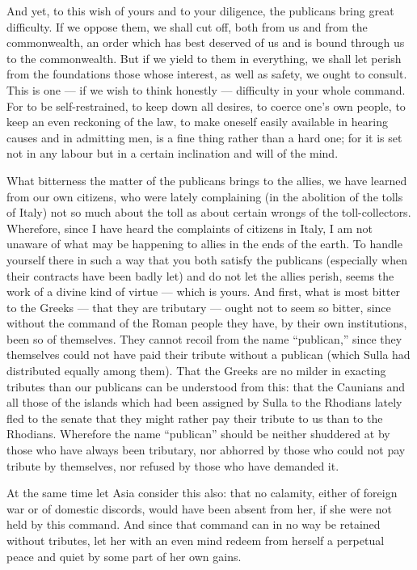 And yet, to this wish of yours and to your diligence, the publicans bring great difficulty. If we oppose them, we shall cut off, both from us and from the commonwealth, an order which has best deserved of us and is bound through us to the commonwealth. But if we yield to them in everything, we shall let perish from the foundations those whose interest, as well as safety, we ought to consult. This is one --- if we wish to think honestly --- difficulty in your whole command. For to be self-restrained, to keep down all desires, to coerce one's own people, to keep an even reckoning of the law, to make oneself easily available in hearing causes and in admitting men, is a fine thing rather than a hard one; for it is set not in any labour but in a certain inclination and will of the mind.

 What bitterness the matter of the publicans brings to the allies, we have learned from our own citizens, who were lately complaining (in the abolition of the tolls of Italy) not so much about the toll as about certain wrongs of the toll-collectors. Wherefore, since I have heard the complaints of citizens in Italy, I am not unaware of what may be happening to allies in the ends of the earth. To handle yourself there in such a way that you both satisfy the publicans (especially when their contracts have been badly let) and do not let the allies perish, seems the work of a divine kind of virtue --- which is yours. And first, what is most bitter to the Greeks --- that they are tributary --- ought not to seem so bitter, since without the command of the Roman people they have, by their own institutions, been so of themselves. They cannot recoil from the name ``publican,'' since they themselves could not have paid their tribute without a publican (which Sulla had distributed equally among them). That the Greeks are no milder in exacting tributes than our publicans can be understood from this: that the Caunians and all those of the islands which had been assigned by Sulla to the Rhodians lately fled to the senate that they might rather pay their tribute to us than to the Rhodians. Wherefore the name ``publican'' should be neither shuddered at by those who have always been tributary, nor abhorred by those who could not pay tribute by themselves, nor refused by those who have demanded it.

 At the same time let Asia consider this also: that no calamity, either of foreign war or of domestic discords, would have been absent from her, if she were not held by this command. And since that command can in no way be retained without tributes, let her with an even mind redeem from herself a perpetual peace and quiet by some part of her own gains.

